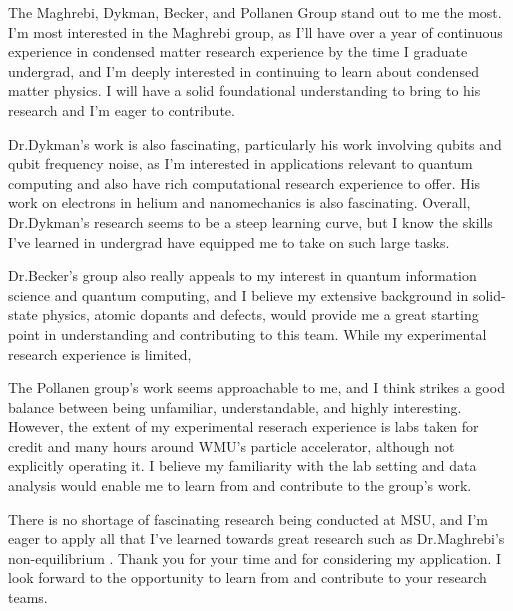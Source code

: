\documentclass[11pt]{article}
\newcommand{\schoolabbr}{MSU}
\begin{document}
The Maghrebi, Dykman, Becker, and Pollanen Group stand out to me the most. I'm most interested in the Maghrebi group, as I'll have over a year of continuous experience in condensed matter research experience by the time I graduate undergrad, and I'm deeply interested in continuing to learn about condensed matter physics. I will have a solid foundational understanding to bring to his research and I'm eager to contribute.

Dr.\@ Dykman's work is also fascinating, particularly his work involving qubits and qubit frequency noise, as I'm interested in applications relevant to quantum computing and also have rich computational research experience to offer. His work on electrons in helium and nanomechanics is also fascinating. Overall, Dr.\@ Dykman's research seems to be a steep learning curve, but I know the skills I've learned in undergrad have equipped me to take on such large tasks.

Dr.\@ Becker's group also really appeals to my interest in quantum information science and quantum computing, and I believe my extensive background in solid-state physics, atomic dopants and defects, would provide me a great starting point in understanding and contributing to this team. While my experimental research experience is limited, 

The Pollanen group's work seems approachable to me, and I think strikes a good balance between being unfamiliar, understandable, and highly interesting. However, the extent of my experimental reserach experience is labs taken for credit and many hours around WMU's particle accelerator, although not explicitly operating it. I believe my familiarity with the lab setting and data analysis would enable me to learn from and contribute to the group's work.

There is no shortage of fascinating research being conducted at \schoolabbr{}, and I'm eager to apply all that I've learned towards great research such as Dr.\@ Maghrebi's non-equilibrium . Thank you for your time and for considering my application. I look forward to the opportunity to learn from and contribute to your research teams.
\end{document}
